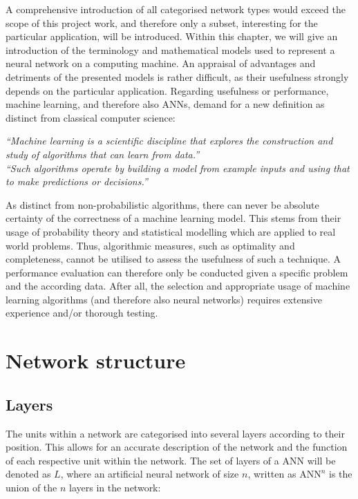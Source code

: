 \documentclass[10pt,a4paper,DIV=11]{scrreprt}
\begin{document}
A comprehensive introduction of all categorised network types would exceed the scope of this project work, and therefore only a subset,
interesting for the particular application, will be introduced. Within this chapter, we will give an introduction of the terminology and mathematical
models used to represent a neural network on a computing machine. An appraisal of advantages and detriments of the presented models is rather 
difficult, as their usefulness strongly depends on the particular application. Regarding usefulness or performance, machine learning, and therefore 
also ANNs, demand for a new definition as distinct from classical computer science:


\textit{“Machine learning is a scientific discipline that explores the construction and study of algorithms that can learn from data.”}\cite{MLDEF1}\\ 


\textit{“Such algorithms operate by building a model from example inputs and using that to make predictions or decisions.”} \cite{MLDEF2} 


As distinct from non-probabilistic algorithms, there can never be absolute certainty of the correctness of a machine learning model. 
This stems from their usage of probability theory and statistical modelling which are applied to real world problems. 
Thus, algorithmic measures, such as optimality and completeness, cannot be utilised to assess the usefulness of such a technique.
A performance evaluation can therefore only be conducted given a specific problem and the according data. After all, the selection and 
appropriate usage of machine learning algorithms (and therefore also neural networks) requires extensive experience and/or thorough testing. 

\section{Network structure}
\subsection{Layers}
The units within a network are categorised into several layers according to their position. This allows for an accurate description of the network 
and the function of each respective unit within the network. The set of layers of a ANN will be denoted as $L$, where an artificial neural network 
of size $n$, written as $\text{ANN}^n$ is the union of the $n$ layers in the network:
\end{document}
